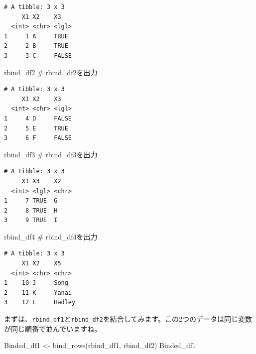\documentclass[
  a4paper,
  pandoc,
  ja=standard,
  jafont=haranoaji]{bxjsbook}
\newenvironment{Shaded}{\begin{snugshade}}{\end{snugshade}}
\newcommand{\CommentTok}[1]{\textcolor[rgb]{0.37,0.37,0.37}{#1}}
\newcommand{\FunctionTok}[1]{\textcolor[rgb]{0.28,0.35,0.67}{#1}}
\newcommand{\NormalTok}[1]{\textcolor[rgb]{0.00,0.48,0.65}{#1}}
\newcommand{\OtherTok}[1]{\textcolor[rgb]{0.00,0.48,0.65}{#1}}
\begin{document}
\begin{verbatim}
# A tibble: 3 x 3
     X1 X2    X3   
  <int> <chr> <lgl>
1     1 A     TRUE 
2     2 B     TRUE 
3     3 C     FALSE
\end{verbatim}

\begin{Shaded}
\begin{Highlighting}[numbers=left,,]
\NormalTok{rbind\_df2 }\CommentTok{\# rbind\_df2を出力}
\end{Highlighting}
\end{Shaded}

\begin{verbatim}
# A tibble: 3 x 3
     X1 X2    X3   
  <int> <chr> <lgl>
1     4 D     FALSE
2     5 E     TRUE 
3     6 F     FALSE
\end{verbatim}

\begin{Shaded}
\begin{Highlighting}[numbers=left,,]
\NormalTok{rbind\_df3 }\CommentTok{\# rbind\_df3を出力}
\end{Highlighting}
\end{Shaded}

\begin{verbatim}
# A tibble: 3 x 3
     X1 X3    X2   
  <int> <lgl> <chr>
1     7 TRUE  G    
2     8 TRUE  H    
3     9 TRUE  I    
\end{verbatim}

\begin{Shaded}
\begin{Highlighting}[numbers=left,,]
\NormalTok{rbind\_df4 }\CommentTok{\# rbind\_df4を出力}
\end{Highlighting}
\end{Shaded}

\begin{verbatim}
# A tibble: 3 x 3
     X1 X2    X5    
  <int> <chr> <chr> 
1    10 J     Song  
2    11 K     Yanai 
3    12 L     Hadley
\end{verbatim}

まずは、\texttt{rbind\_df1}と\texttt{rbind\_df2}を結合してみます。この2つのデータは同じ変数が同じ順番で並んでいますね。

\begin{Shaded}
\begin{Highlighting}[numbers=left,,]
\NormalTok{Binded\_df1 }\OtherTok{\textless{}{-}} \FunctionTok{bind\_rows}\NormalTok{(rbind\_df1, rbind\_df2)}
\NormalTok{Binded\_df1}
\end{Highlighting}
\end{Shaded}
\end{document}
